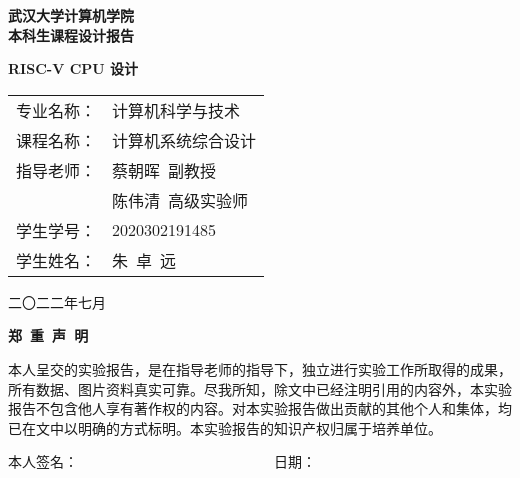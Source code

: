 \documentclass{article}
\begin{document}
    \begin{center}
    \vspace{50pt}
    {
        \bf
        武汉大学计算机学院 \\
        本科生课程设计报告
    }
    \end{center}

    \begin{center}
    \vspace{50pt}
    {
        \bf
        RISC-V CPU 设计
    }
    \end{center}

    \begin{center}
    \vspace{50pt}
    {
        \large{}
        \begin{tabular}{ll}
            专业名称：& 计算机科学与技术 \\
            课程名称：& 计算机系统综合设计 \\
            指导老师：& 蔡朝晖\  副教授 \\
                      & 陈伟清\  高级实验师 \\
            学生学号：& 2020302191485 \\
            学生姓名：& 朱\ 卓\ 远 \\
        \end{tabular}
    }
    \end{center}

    \vspace{100pt}

    \begin{center}
        {
            二〇二二年七月
        }
    \end{center}

    \newpage{}
    \begin{center}
    {
        \bf
        郑\ 重\ 声\ 明
    }
    \end{center}
    \vspace{20pt}
    {
        \normalsize{}
        \par{}
        本人呈交的实验报告，是在指导老师的指导下，独立进行实验工作所取得的成果，所有数据、图片资料真实可靠。尽我所知，除文中已经注明引用的内容外，本实验报告不包含他人享有著作权的内容。对本实验报告做出贡献的其他个人和集体，均已在文中以明确的方式标明。本实验报告的知识产权归属于培养单位。
    }
    \vspace{20pt}
    {
        \normalsize{}
        \newline{}
        本人签名：\ \ \ \ \ \ \ \ \ \ \ \ \ \ \ \ \ \ \ \ \ \ \ \ \ \ \ \ 
        日期：
    }
\end{document}

